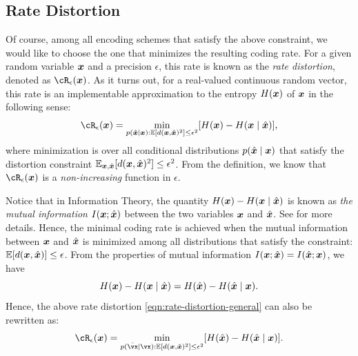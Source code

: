 \documentclass[../../book-main.tex]{subfiles}
\begin{document}
\subsection{Rate Distortion}
Of course, among all encoding schemes that satisfy the above constraint, we would like to choose the one that minimizes the resulting coding rate. For a given random variable $\bm{x}$ and a precision $\epsilon$, this rate is known as the {\em rate distortion}, denoted as $\cR_{\epsilon}(\x)$. As it turns out, for a real-valued continuous random vector, this rate is an implementable approximation to the entropy $H(\bm{x})$ of $\bm{x}$ in the following sense:
\begin{equation}
	\cR_{\epsilon}(\x) = \min_{p(\hat \x \mid \x): \Ex[d(\x, \hat \x)^{2}] \le \epsilon^{2}} [H(\x) - H(\x \mid \hat{\x})],
    \label{eqn:rate-distortion-general}
\end{equation}
where minimization is over all conditional distributions $p(\hat {\bm{x}} \mid \bm{x})$ that satisfy the distortion constraint $\operatorname{\mathbb{E}}_{\bm{x}, \hat {\bm{x}}}[d(\bm{x}, \hat {\bm{x}})^{2}] \le \epsilon^{2}$. From the definition, we know that $\cR_{\epsilon}(\x)$ is a {\em non-increasing} function in $\epsilon$.

\begin{remark}
	Notice that in Information Theory, the quantity $H(\bm{x}) - H(\bm{x} \mid \hat {\bm{x}})$ is known as {\em the mutual information} $I(\bm{x}; \hat {\bm{x}})$ between the two variables $\bm{x}$ and $\hat {\bm{x}}$. See \cite{Cover-Thomas} for more details. Hence, the minimal coding rate is achieved when the mutual information between $\bm{x}$ and $\hat {\bm{x}}$ is minimized among all distributions that satisfy the constraint: $\mathbb{E} [d(\bm{x}, \hat {\bm{x}})] \le \epsilon$. From the properties of mutual information $I(\bm{x}; \hat {\bm{x}}) = I(\hat {\bm{x}}; \bm{x})$, we have  
	\begin{equation}
        H(\bm{x}) - H(\bm{x} \mid \hat{\bm{x}}) = H(\hat{\bm{x}}) - H(\hat{\bm{x}} \mid {\bm{x}}).
    \end{equation}
    Hence, the above rate distortion \eqref{eqn:rate-distortion-general} can also be rewritten as:
    \begin{equation}
		\cR_{\epsilon}(\x) = \min_{p(\hat \vx \mid \vx): \mathbb{E} [d(\x, \hat \x)^{2}] \le \epsilon^{2}} [H(\hat \x) - H(\hat \x \mid \x)].  \label{eqn:rate-distortion-general-2}
	\end{equation}
\end{remark}
\end{document}
